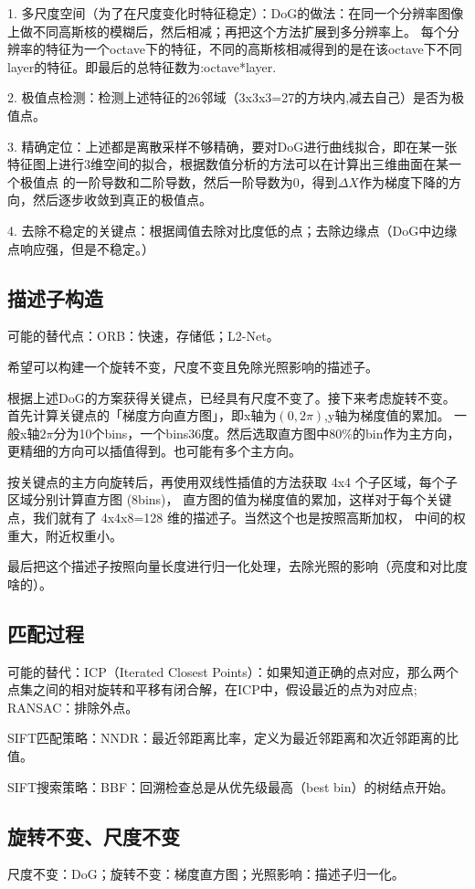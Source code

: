 \documentclass[12pt]{article}
\begin{document}
1. 多尺度空间（为了在尺度变化时特征稳定）：DoG的做法：在同一个分辨率图像上做不同高斯核的模糊后，然后相减；再把这个方法扩展到多分辨率上。
每个分辨率的特征为一个octave下的特征，不同的高斯核相减得到的是在该octave下不同layer的特征。即最后的总特征数为:octave*layer.

2. 极值点检测：检测上述特征的26邻域（3x3x3=27的方块内,减去自己）是否为极值点。

3. 精确定位：上述都是离散采样不够精确，要对DoG进行曲线拟合，即在某一张特征图上进行3维空间的拟合，根据数值分析的方法可以在计算出三维曲面在某一个极值点
的一阶导数和二阶导数，然后一阶导数为0，得到$\Delta X$作为梯度下降的方向，然后逐步收敛到真正的极值点。

4. 去除不稳定的关键点：根据阈值去除对比度低的点；去除边缘点（DoG中边缘点响应强，但是不稳定。）

\subsection{描述子构造}
可能的替代点：ORB：快速，存储低；L2-Net。

希望可以构建一个旋转不变，尺度不变且免除光照影响的描述子。

根据上述DoG的方案获得关键点，已经具有尺度不变了。接下来考虑旋转不变。首先计算关键点的「梯度方向直方图」，即x轴为$(0,2\pi)$,y轴为梯度值的累加。
一般x轴$2\pi$分为10个bins，一个bins36度。然后选取直方图中80\%的bin作为主方向，更精细的方向可以插值得到。也可能有多个主方向。

按关键点的主方向旋转后，再使用双线性插值的方法获取 4x4 个子区域，每个子区域分别计算直方图 (8bins)，
直方图的值为梯度值的累加，这样对于每个关键点，我们就有了 4x4x8=128 维的描述子。当然这个也是按照高斯加权，
中间的权重大，附近权重小。

最后把这个描述子按照向量长度进行归一化处理，去除光照的影响（亮度和对比度啥的）。

\subsection{匹配过程}
可能的替代：ICP（Iterated Closest Points）：如果知道正确的点对应，那么两个点集之间的相对旋转和平移有闭合解，在ICP中，假设最近的点为对应点;
RANSAC：排除外点。

SIFT匹配策略：NNDR：最近邻距离比率，定义为最近邻距离和次近邻距离的比值。

SIFT搜索策略：BBF：回溯检查总是从优先级最高（best bin）的树结点开始。

\subsection{旋转不变、尺度不变}
尺度不变：DoG；旋转不变：梯度直方图；光照影响：描述子归一化。
\end{document}
